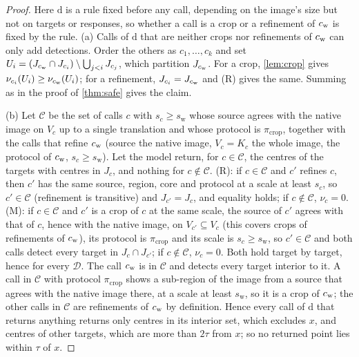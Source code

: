 \begin{proof}
Here $\mathrm{d}$ is a rule fixed before any call, depending on the image's size but not on targets or responses, so whether a call is a crop or a refinement of $c_{\mathrm{w}}$ is fixed by the rule.
(a) Calls of $\mathrm{d}$ that are neither crops nor refinements of $c_{\mathrm{w}}$ can only add detections. Order the others as $c_1, \dots, c_k$ and set $U_i = (J_{c_{\mathrm{w}}} \cap J_{c_i}) \setminus \bigcup_{j<i} J_{c_j}$, which partition $J_{c_{\mathrm{w}}}$. For a crop, \cref{lem:crop} gives $\nu_{c_i}(U_i) \ge \nu_{c_{\mathrm{w}}}(U_i)$; for a refinement, $J_{c_i} = J_{c_{\mathrm{w}}}$ and (R) gives the same. Summing as in the proof of \cref{thm:safe} gives the claim.

(b) Let $\mathcal{C}$ be the set of calls $c$ with $s_c \ge s_{\mathrm{w}}$ whose source agrees with the native image on $V_c$ up to a single translation and whose protocol is $\pi_{\mathrm{crop}}$, together with the calls that refine $c_{\mathrm{w}}$ (source the native image, $V_c = K_c$ the whole image, the protocol of $c_{\mathrm{w}}$, $s_c \ge s_{\mathrm{w}}$). Let the model return, for $c \in \mathcal{C}$, the centres of the targets with centres in $J_c$, and nothing for $c \notin \mathcal{C}$. (R): if $c \in \mathcal{C}$ and $c'$ refines $c$, then $c'$ has the same source, region, core and protocol at a scale at least $s_c$, so $c' \in \mathcal{C}$ (refinement is transitive) and $J_{c'} = J_c$, and equality holds; if $c \notin \mathcal{C}$, $\nu_c = 0$. (M): if $c \in \mathcal{C}$ and $c'$ is a crop of $c$ at the same scale, the source of $c'$ agrees with that of $c$, hence with the native image, on $V_{c'} \subseteq V_c$ (this covers crops of refinements of $c_{\mathrm{w}}$), its protocol is $\pi_{\mathrm{crop}}$ and its scale is $s_c \ge s_{\mathrm{w}}$, so $c' \in \mathcal{C}$ and both calls detect every target in $J_c \cap J_{c'}$; if $c \notin \mathcal{C}$, $\nu_c = 0$. Both hold target by target, hence for every $\mathcal{D}$. The call $c_{\mathrm{w}}$ is in $\mathcal{C}$ and detects every target interior to it. A call in $\mathcal{C}$ with protocol $\pi_{\mathrm{crop}}$ shows a sub-region of the image from a source that agrees with the native image there, at a scale at least $s_{\mathrm{w}}$, so it is a crop of $c_{\mathrm{w}}$; the other calls in $\mathcal{C}$ are refinements of $c_{\mathrm{w}}$ by definition. Hence every call of $\mathrm{d}$ that returns anything returns only centres in its interior set, which excludes $x$, and centres of other targets, which are more than $2\tau$ from $x$; so no returned point lies within $\tau$ of $x$.


\end{proof}
